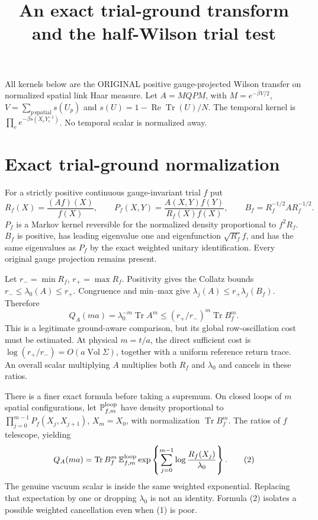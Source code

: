 \documentclass{article}
\title{An exact trial-ground transform and the half-Wilson trial test}\author{}\date{}
\begin{document}
\maketitle
All kernels below are the ORIGINAL positive gauge-projected Wilson transfer on normalized spatial link Haar measure. Let $A=M Q P M$, with $M=e^{-\beta V/2}$, $V=\sum_{p\,\mathrm{spatial}}s(U_p)$ and $s(U)=1-\operatorname{Re}\operatorname{Tr}(U)/N$. The temporal kernel is $\prod_e e^{-\beta s(X_eY_e^{-1})}$. No temporal scalar is normalized away.

\section*{Exact trial-ground normalization}
For a strictly positive continuous gauge-invariant trial $f$ put
\[
 R_f(X)=\frac{(Af)(X)}{f(X)},\qquad
 P_f(X,Y)=\frac{A(X,Y)f(Y)}{R_f(X)f(X)},\qquad
 B_f=R_f^{-1/2} A R_f^{-1/2}.
\]
$P_f$ is a Markov kernel reversible for the normalized density proportional to $f^2R_f$. $B_f$ is positive, has leading eigenvalue one and eigenfunction $\sqrt{R_f}f$, and has the same eigenvalues as $P_f$ by the exact weighted unitary identification. Every original gauge projection remains present.

Let $r_-=\min R_f$, $r_+=\max R_f$. Positivity gives the Collatz bounds $r_-\le\lambda_0(A)\le r_+$. Congruence and min--max give $\lambda_j(A)\le r_+\lambda_j(B_f)$. Therefore
\[
 Q_A(ma)=\lambda_0^{-m}\operatorname{Tr}A^m
 \le (r_+/r_-)^m\operatorname{Tr}B_f^m.                 \tag{1}
\]
This is a legitimate ground-aware comparison, but its global row-oscillation cost must be estimated. At physical $m=t/a$, the direct sufficient cost is $\log(r_+/r_-)=O(a\operatorname{Vol}\Sigma)$, together with a uniform reference return trace. An overall scalar multiplying $A$ multiplies both $R_f$ and $\lambda_0$ and cancels in these ratios.

There is a finer exact formula before taking a supremum. On closed loops of $m$ spatial configurations, let $\mathbb P_{f,m}^{\rm loop}$ have density proportional to $\prod_{j=0}^{m-1}P_f(X_j,X_{j+1})$, $X_m=X_0$, with normalization $\operatorname{Tr}B_f^m$. The ratios of $f$ telescope, yielding
\[
 Q_A(ma)=\operatorname{Tr}B_f^m\,
 \mathbb E_{f,m}^{\rm loop}
 \exp\left\{\sum_{j=0}^{m-1}\log\frac{R_f(X_j)}{\lambda_0}\right\}. \tag{2}
\]
The genuine vacuum scalar is inside the same weighted exponential. Replacing that expectation by one or dropping $\lambda_0$ is not an identity. Formula (2) isolates a possible weighted cancellation even when (1) is poor.
\end{document}
